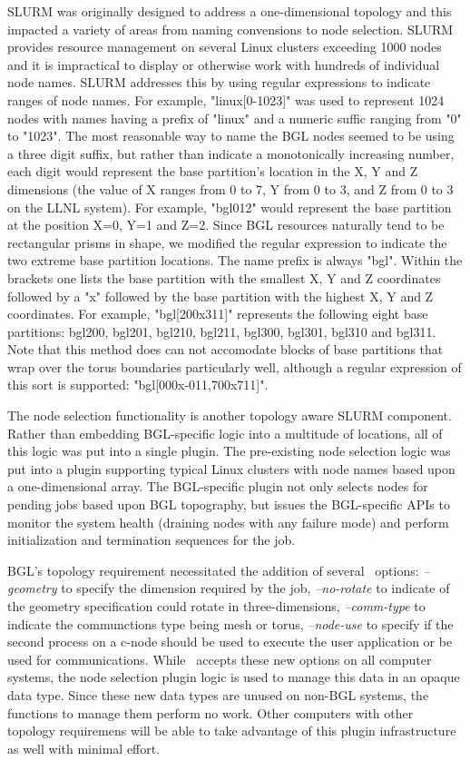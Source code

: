 \documentclass[10pt,onecolumn,times]{../common/llncs}
\begin{document}
{SLURM was originally designed to address a one-dimensional topology
and this impacted a variety of areas from naming convensions to 
node selection. 
SLURM provides resource management on several Linux clusters 
exceeding 1000 nodes and it is impractical to display or otherwise 
work with hundreds of individual node names. 
SLURM addresses this by using regular expressions to indicate 
ranges of node names. 
For example, "linux[0-1023]" was used to represent 1024 nodes 
with names having a prefix of "linux" and a numeric suffic ranging 
from "0" to "1023". 
The most reasonable way to name the BGL nodes seemed to be 
using a three digit suffix, but rather than indicate a monotonically 
increasing number, each digit would represent the base partition's 
location in the X, Y and Z dimensions (the value of X ranges 
from 0 to 7, Y from 0 to 3, and Z from 0 to 3 on the LLNL system).
For example, "bgl012" would represent the base partition at
the position X=0, Y=1 and Z=2.
Since BGL resources naturally tend to be rectangular prisms in 
shape, we modified the regular expression to indicate the two 
extreme base partition locations. 
The name prefix is always "bgl". 
Within the brackets one lists the base partition with the smallest
X, Y and Z coordinates followed by a "x" followed by the base 
partition with the highest X, Y and Z coordinates.
For example, "bgl[200x311]" represents the following eight base 
partitions: bgl200, bgl201, bgl210, bgl211, bgl300, bgl301, bgl310
and bgl311.
Note that this method does can not accomodate blocks of base 
partitions that wrap over the torus boundaries particularly well, 
although a regular expression of this sort is supported: 
"bgl[000x-011,700x711]".

The node selection functionality is another topology aware 
SLURM component. 
Rather than embedding BGL-specific logic into a multitude of 
locations, all of this logic was put into a single plugin. 
The pre-existing node selection logic was put into a plugin 
supporting typical Linux clusters with node names based 
upon a one-dimensional array. 
The BGL-specific plugin not only selects nodes for pending jobs 
based upon BGL topography, but issues the BGL-specific APIs 
to monitor the system health (draining nodes with any failure 
mode) and perform initialization and termination sequences for the job.

BGL's topology requirement necessitated the addition of several 
\srun\ options: {\em --geometry} to specify the dimension required by 
the job,
 {\em --no-rotate} to indicate of the geometry specification could rotate 
in three-dimensions,
{\em --comm-type} to indicate the communctions type being mesh or torus,
{\em --node-use} to specify if the second process on a c-node should 
be used to execute the user application or be used for communications. 
While \srun\ accepts these new options on all computer systems, 
the node selection plugin logic is used to manage this data in an 
opaque data type. 
Since these new data types are unused on non-BGL systems, the 
functions to manage them perform no work. 
Other computers with other topology requiremens will be able to 
take advantage of this plugin infrastructure as well with minimal 
effort.

}
\end{document}
